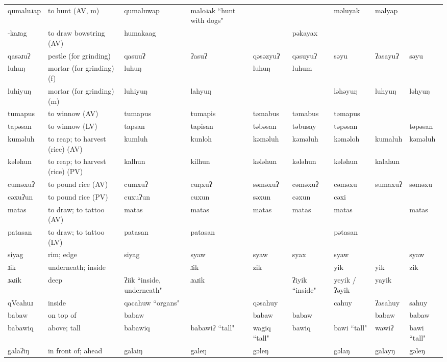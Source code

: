 \begin{landscape}
\begin{longtable}{*{9}{p{}}}
\text{*}qumaluɹap & to hunt (AV, m) & qumaluwap & maloɹak ``hunt with dogs" &  &  & məluyak & malyap & \\
\text{*}-kaɹag & to draw bowstring (AV) & humakaag &  &  & pəkayax &  &  & \\
\text{*}qasəɹuʔ & pestle (for grinding) & qasuuʔ & ʔasuʔ & qəsəzyuʔ & qəsuyuʔ & səyu & ʔasayuʔ & səyu\\
\text{*}luhuŋ & mortar (for grinding) (f) & luhuŋ &  & luhuŋ & luhum &  &  & \\
\text{*}luhiyuŋ & mortar (for grinding) (m) & luhiyuŋ & lahyuŋ &  &  & ləhəyuŋ & luhyuŋ & ləhyuŋ\\
\text{*}tumapus & to winnow (AV) & tumapus & tumapis & təmabus & təmabus & təmapus &  & \\
\text{*}tapəsan & to winnow (LV) & tapsan & tapisan & təbəsan & təbusay & təpəsan &  & təpəsan\\
\text{*}kuməluh & to reap; to harvest (rice) (AV) & kumluh & kunloh & kəməluh & kəməluh & kəməloh & kumaluh & kəməluh\\
\text{*}kələhun & to reap; to harvest (rice) (PV) & kalhun & kilhun & kələhun & kələhun & kələhun & kalahun & \\
\text{*}cuməxuʔ & to pound rice (AV) & cumxuʔ & cuŋxuʔ & səməxuʔ & cəməxuʔ & cəməxu & sumaxuʔ & səməxu\\
\text{*}cəxuʔun & to pound rice (PV) & cuxuʔun & cuxun & səxun & cəxun & cəxi &  & \\
\text{*}matas & to draw; to tattoo (AV) & matas & matas & matas & matas & matas &  & matas\\
\text{*}patasan & to draw; to tattoo (LV) & patasan & patasan &  &  & pətasan &  & \\
\text{*}siyag & rim; edge & siyag & syaw & syaw & syax & syaw &  & syaw\\
\text{*}ɹik & underneath; inside &  & ɹik & zik &  & yik & yik & zik\\
\text{*}ɹəɹik & deep & ʔiik ``inside, underneath" & ɹaɹik &  & ʔiyik ``inside" & yeyik / ʔəyik & yayik & \\
\text{*}qVcahuɹ & inside & qacahuw ``organs" &  & qəsahuy &  & cahuy & ʔasahuy & sahuy\\
\text{*}babaw & on top of & babaw &  & babaw & babaw &  & babaw & babaw\\
\text{*}babawiq & above; tall & babawiq & babawiʔ ``tall" & wagiq ``tall" & bawiq & bawi ``tall" & wawiʔ & bawi ``tall"\\
\text{*}galaʔiŋ & in front of; ahead & galaiŋ & galeŋ & gəleŋ &  & gəlaŋ & galayŋ & gəleŋ\\

\end{longtable}
\end{landscape}

